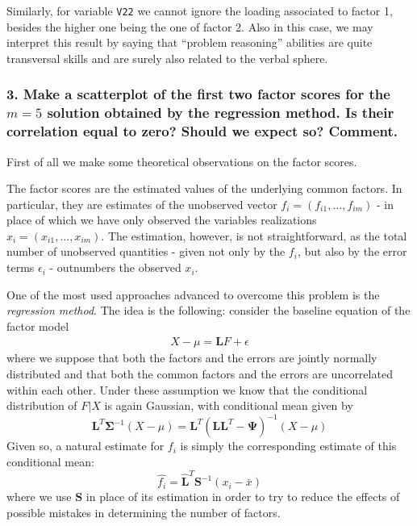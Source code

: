 \documentclass[
  letterpaper,
  DIV=11,
  numbers=noendperiod]{scrartcl}
\begin{document}
Similarly, for variable \texttt{V22} we cannot ignore the loading
associated to factor 1, besides the higher one being the one of factor
2. Also in this case, we may interpret this result by saying that
``problem reasoning'' abilities are quite transversal skills and are
surely also related to the verbal sphere.

\hypertarget{make-a-scatterplot-of-the-first-two-factor-scores-for-the-m-5-solution-obtained-by-the-regression-method.-is-their-correlation-equal-to-zero-should-we-expect-so-comment.}{%
\subsubsection{\texorpdfstring{3. Make a scatterplot of the first two
factor scores for the \(m = 5\) solution obtained by the regression
method. Is their correlation equal to zero? Should we expect so?
Comment.}{3. Make a scatterplot of the first two factor scores for the m = 5 solution obtained by the regression method. Is their correlation equal to zero? Should we expect so? Comment.}}\label{make-a-scatterplot-of-the-first-two-factor-scores-for-the-m-5-solution-obtained-by-the-regression-method.-is-their-correlation-equal-to-zero-should-we-expect-so-comment.}}

First of all we make some theoretical observations on the factor scores.

The factor scores are the estimated values of the underlying common
factors. In particular, they are estimates of the unobserved vector
\(f_i = (f_{i1}, \dots, f_{im})\) - in place of which we have only
observed the variables realizations \(x_i = (x_{i1}, \dots, x_{im})\).
The estimation, however, is not straightforward, as the total number of
unobserved quantities - given not only by the \(f_i\), but also by the
error terms \(\epsilon_i\) - outnumbers the observed \(x_i\).

One of the most used approaches advanced to overcome this problem is the
\emph{regression method}. The idea is the following: consider the
baseline equation of the factor model
\begin{align}
  X - \mu = \mathbf{L}F + \epsilon
  \end{align}
 where we suppose that both the factors and the errors are jointly
normally distributed and that both the common factors and the errors are
uncorrelated within each other. Under these assumption we know that the
conditional distribution of \(F|X\) is again Gaussian, with conditional
mean given by \[
 \mathbf{L}^T\mathbf{\Sigma}^{-1}(X-\mu) = \mathbf{L}^T(\mathbf{LL}^T -\mathbf{\Psi})^{-1}(X-\mu)
\] Given so, a natural estimate for \(f_i\) is simply the corresponding
estimate of this conditional mean: \[
\hat{f_i} = \hat{\mathbf{L}}^T\mathbf{S}^{-1}(x_i-\bar{x})
\] where we use \(\mathbf{S}\) in place of its estimation in order to
try to reduce the effects of possible mistakes in determining the number
of factors.
\end{document}
